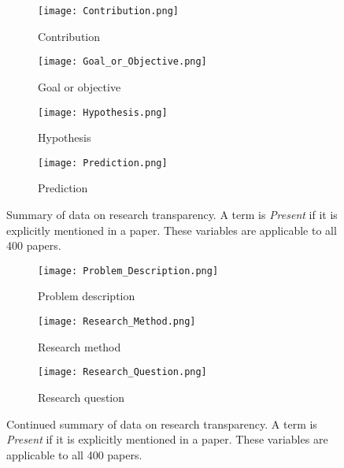 \begin{figure}[!h]
\begin{center}
    \begin{subfigure}[b]{0.45\textwidth}
        \texttt{[image: Contribution.png]}
        \caption{Contribution}
        \label{fig:contribution}
    \end{subfigure}
    \begin{subfigure}[b]{0.45\textwidth}
        \texttt{[image: Goal\_or\_Objective.png]}
        \caption{Goal or objective}
        \label{fig:goal_or_objective}
    \end{subfigure}
    \begin{subfigure}[b]{0.45\textwidth}
        \texttt{[image: Hypothesis.png]}
        \caption{Hypothesis}
        \label{fig:hypothesis}
    \end{subfigure}
    \begin{subfigure}[b]{0.45\textwidth}
        \texttt{[image: Prediction.png]}
        \caption{Prediction}
        \label{fig:prediction}
    \end{subfigure}
    \caption[Summary of research transparency data.]{Summary of data on research transparency. A term is \emph{Present} if it is explicitly mentioned in a paper. These variables are applicable to all 400 papers.}
    \label{fig:transparency-data-a}
\end{center}
\end{figure}
\begin{figure}[!h]
\begin{center}
    \begin{subfigure}[b]{0.4\textwidth}
        \texttt{[image: Problem\_Description.png]}
        \caption{Problem description}
        \label{fig:problem_description}
    \end{subfigure}
    \begin{subfigure}[b]{0.4\textwidth}
        \texttt{[image: Research\_Method.png]}
        \caption{Research method}
        \label{fig:research_method}
    \end{subfigure}
    \begin{subfigure}[b]{0.4\textwidth}
        \texttt{[image: Research\_Question.png]}
        \caption{Research question}
        \label{fig:research_question}
    \end{subfigure}
    \caption[Summary of research transparency data continued.]{Continued summary of data on research transparency. A term is \emph{Present} if it is explicitly mentioned in a paper. These variables are applicable to all 400 papers.}
    \label{fig:transparency-data-b}
\end{center}
\end{figure}
\clearpage


